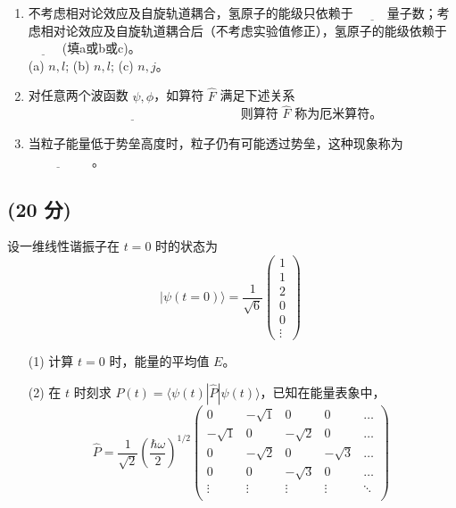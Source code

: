 \begin{enumerate}
    \item 不考虑相对论效应及自旋轨道耦合，氢原子的能级只依赖于 $\underline{\hspace{1cm}}$量子数；考虑相对论效应及自旋轨道耦合后（不考虑实验值修正），氢原子的能级依赖于 $\underline{\hspace{1cm}}$ (填a或b或c)。\\
   (a) $n, l$;  (b) $n, l$;  (c) $n, j$。
    \item 对任意两个波函数 $\psi, \phi$，如算符 $\hat{F}$ 满足下述关系 $\underline{\hspace{7cm}}$ 则算符 $\hat{F}$ 称为厄米算符。

    \item 当粒子能量低于势垒高度时，粒子仍有可能透过势垒，这种现象称为$\underline{\hspace{2cm}}$ 。
\end{enumerate}
\subsection{(20 分)}
设一维线性谐振子在 $t = 0$ 时的状态为
\[
|\psi(t=0)\rangle = \frac{1}{\sqrt{6}}
\begin{pmatrix}
1 \\
1 \\
2 \\
0 \\
0 \\
\vdots
\end{pmatrix}~
\]

\begin{enumerate}
    \item [(1)] 计算 $t = 0$ 时，能量的平均值 $E$。
    
    \item [(2)] 在 $t$ 时刻求 $P(t) = \langle \psi(t) | \hat{P} | \psi(t) \rangle$，已知在能量表象中，
    \[
    \hat{P} = \frac{1}{\sqrt{2}} \left(\frac{\hbar \omega}{2}\right)^{1/2}
    \begin{pmatrix}
    0 & -\sqrt{1} & 0 & 0 & \dots \\
    -\sqrt{1} & 0 & -\sqrt{2} & 0 & \dots \\
    0 & -\sqrt{2} & 0 & -\sqrt{3} & \dots \\
    0 & 0 & -\sqrt{3} & 0 & \dots \\
    \vdots & \vdots & \vdots & \vdots & \ddots \\
    \end{pmatrix}~
    \]
\end{enumerate}
